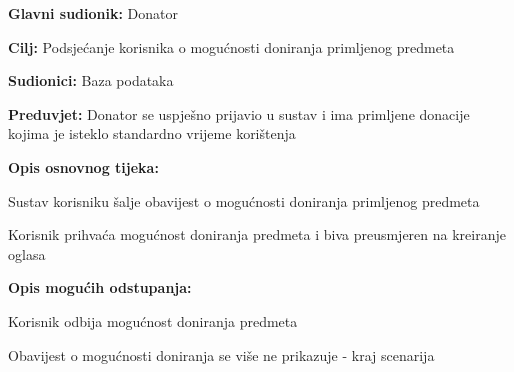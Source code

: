 					\noindent {}
					\begin{packed_item}
	
						\item \textbf{Glavni sudionik: }Donator
						\item  \textbf{Cilj:} Podsjećanje korisnika o mogućnosti doniranja primljenog predmeta
						\item  \textbf{Sudionici:} Baza podataka
						\item  \textbf{Preduvjet:} Donator se uspješno prijavio u sustav i ima primljene donacije kojima je isteklo standardno vrijeme korištenja
						\item  \textbf{Opis osnovnog tijeka:}
						
						\item[] \begin{packed_enum}
							\item Sustav korisniku šalje obavijest o mogućnosti doniranja primljenog predmeta
							\item Korisnik prihvaća mogućnost doniranja predmeta i biva preusmjeren na kreiranje oglasa
						\end{packed_enum}

						\item  \textbf{Opis mogućih odstupanja:}

						\item[] \begin{packed_item}
							\item[2.a] Korisnik odbija mogućnost doniranja predmeta
							\item[] \begin{packed_enum}
								
								\item Obavijest o mogućnosti doniranja se više ne prikazuje - kraj scenarija
							
							\end{packed_enum}	
						\end{packed_item}
					\end{packed_item}
					
				\eject

